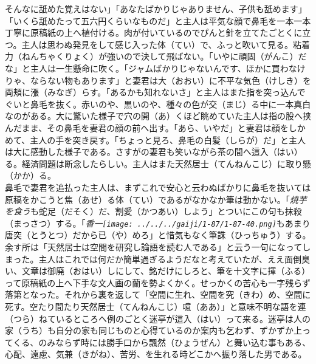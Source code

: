 \documentclass{book}
\begin{document}
そんなに舐めた覚えはない」「あなたばかりじゃありません、子供も舐めます」「いくら舐めたって五六円くらいなものだ」と主人は平気な顔で鼻毛を一本一本丁寧に原稿紙の上へ植付ける。肉が付いているのでぴんと針を立てたごとくに立つ。主人は思わぬ発見をして感じ入った体（てい）で、ふっと吹いて見る。粘着力（ねんちゃくりょく）が強いので決して飛ばない。「いやに頑固（がんこ）だな」と主人は一生懸命に吹く。「ジャムばかりじゃないんです、ほかに買わなけりゃ、ならない物もあります」と妻君は大（おおい）に不平な気色（けしき）を両頬に漲（みなぎ）らす。「あるかも知れないさ」と主人はまた指を突っ込んでぐいと鼻毛を抜く。赤いのや、黒いのや、種々の色が交（まじ）る中に一本真白なのがある。大に驚いた様子で穴の開（あ）くほど眺めていた主人は指の股へ挟んだまま、その鼻毛を妻君の顔の前へ出す。「あら、いやだ」と妻君は顔をしかめて、主人の手を突き戻す。「ちょっと見ろ、鼻毛の白髪（しらが）だ」と主人は大に感動した様子である。さすがの妻君も笑いながら茶の間へ這入（はい）る。経済問題は断念したらしい。主人はまた天然居士（てんねんこじ）に取り懸（かか）る。\\
鼻毛で妻君を追払った主人は、まずこれで安心と云わぬばかりに鼻毛を抜いては原稿をかこうと焦（あせ）る体（てい）であるがなかなか筆は動かない。「\emph{焼芋を食う}も蛇足（だそく）だ、割愛（かつあい）しよう」とついにこの句も抹殺（まっさつ）する。「\emph{香一\texttt{[image: ../../../gaiji/1-87/1-87-40.png]}}もあまり唐突（とうとつ）だから已（や）めろ」と惜気もなく筆誅（ひっちゅう）する。余す所は「天然居士は空間を研究し論語を読む人である」と云う一句になってしまった。主人はこれでは何だか簡単過ぎるようだなと考えていたが、ええ面倒臭い、文章は御廃（おはい）しにして、銘だけにしろと、筆を十文字に揮（ふる）って原稿紙の上へ下手な文人画の蘭を勢よくかく。せっかくの苦心も一字残らず落第となった。それから裏を返して「空間に生れ、空間を究（きわ）め、空間に死す。空たり間たり天然居士（てんねんこじ）噫（ああ）」と意味不明な語を連（つら）ねているところへ例のごとく迷亭が這入（はい）って来る。迷亭は人の家（うち）も自分の家も同じものと心得ているのか案内も乞わず、ずかずか上ってくる、のみならず時には勝手口から飄然（ひょうぜん）と舞い込む事もある、心配、遠慮、気兼（きがね）、苦労、を生れる時どこかへ振り落した男である。\\
\end{document}
